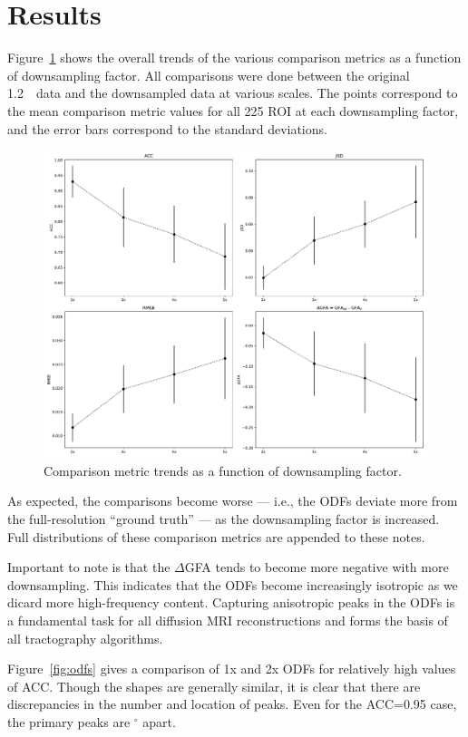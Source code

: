 \documentclass[11pt]{article}
\begin{document}
\section{Results}
Figure~\ref{fig:trends} shows the overall trends of the various comparison
metrics as a function of downsampling factor. All comparisons were done between
the original 1.2~\um~data and the downsampled data at various scales. The points
correspond to the mean comparison metric values for all 225 ROI at each
downsampling factor, and the error bars correspond to the standard deviations.

\begin{figure}[h]
  \centering
  \includegraphics[width=\linewidth]{../plots/per_ds_factor}
  \caption{Comparison metric trends as a function of downsampling factor.}
  \label{fig:trends}
\end{figure}

As expected, the comparisons become worse --- i.e., the ODFs deviate more from
the full-resolution ``ground truth'' --- as the downsampling factor is
increased. Full distributions of these comparison metrics are appended to
these notes. 

Important to note is that the $\Delta$GFA tends to become more negative with
more downsampling. This indicates that the ODFs become increasingly isotropic
as we dicard more high-frequency content. Capturing anisotropic peaks in the 
ODFs is a fundamental task for all diffusion MRI reconstructions and forms
the basis of all tractography algorithms.

Figure~\ref{fig:odfs} gives a comparison of 1x and 2x ODFs for relatively
high values of ACC. Though the shapes are generally similar, it is clear
that there are discrepancies in the number and location of peaks. Even
for the ACC=0.95 case, the primary peaks are $^\circ$ apart. 
\end{document}
